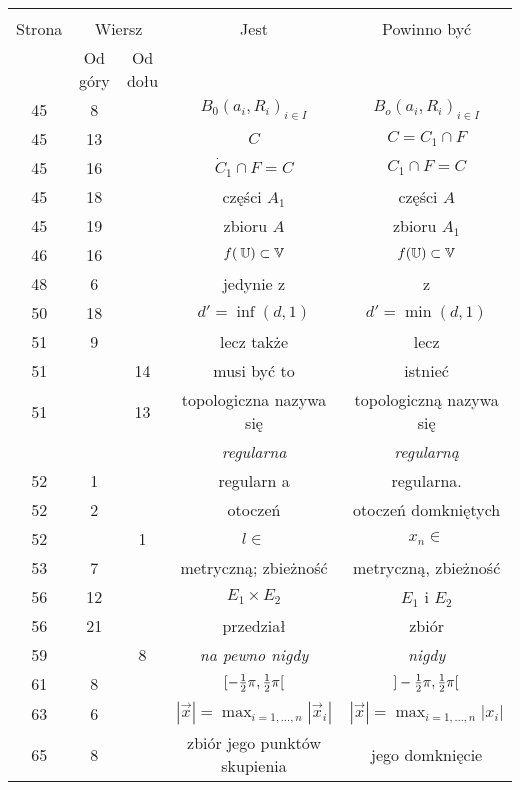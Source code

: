 \documentclass[a4paper,11pt]{article}
\begin{document}
\begin{center}
  \begin{tabular}{|c|c|c|c|c|}
    \hline
    & \multicolumn{2}{c|}{} & & \\
    Strona & \multicolumn{2}{c|}{Wiersz} & Jest
                              & Powinno być \\ \cline{2-3}
    & Od góry & Od dołu & & \\
    \hline
    45  &  8 & & $B_{ 0 }( a_{ i }, R_{ i } )_{ i \in I }$
           & $B_{ o }( a_{ i }, R_{ i } )_{ i \in I }$ \\
    45  & 13 & & $C$ & $C = C_{ 1 } \cap F$ \\
    45  & 16 & & $\dot{ C }_{ 1 } \cap F = C$ & $C_{ 1 } \cap F = C$ \\
    45  & 18 & & części $A_{ 1 }$ & części $A$ \\
    45  & 19 & & zbioru $A$ & zbioru $A_{ 1 }$ \\
    46  & 16 & & $f( \: \mathbb{U} ) \subset \mathbb{V}$ & $f( \mathbb{U} ) \subset \mathbb{V}$ \\
    48  &  6 & & jedynie z & z \\
    50  & 18 & & $d' = \inf( d, 1 )$ & $d' = \min( d, 1 )$ \\
    51  &  9 & & lecz także & lecz \\
    51  & & 14 & musi być to & istnieć \\
    51  & & 13 & topologiczna nazywa się & topologiczną nazywa się \\
    & & & \emph{regularna} & \emph{regularną} \\  %
    52  &  1 & & regularn a & regularna. \\
    52  &  2 & & otoczeń & otoczeń domkniętych \\
    52  & &  1 & $l \in$ & $x_{ n } \in$ \\
    53  &  7 & & metryczną; zbieżność & metryczną, zbieżność \\
    56  & 12 & & $E_{ 1 } \times E_{ 2 }$ & $E_{ 1 }$ i $E_{ 2 }$ \\
    56  & 21 & & przedział & zbiór \\
    59  & &  8 & \emph{na pewno nigdy} & \emph{nigdy} \\
    61  &  8 & & $[ -\frac{ 1 }{ 2 } \pi, \frac{ 1 }{ 2 } \pi [$
           & $] -\frac{ 1 }{ 2 } \pi, \frac{ 1 }{ 2 } \pi [$ \\
    63  &  6 & & $| \vec{ x } | = \max_{ i = 1, \ldots, n}
                 | \vec{ x }_{ i } |$
           & $| \vec{ x } | = \max_{ i = 1, \ldots, n} | x_{ i } |$ \\
    65  &  8 & & zbiór jego punktów skupienia & jego domknięcie \\

\end{tabular}
\end{center}
\end{document}

